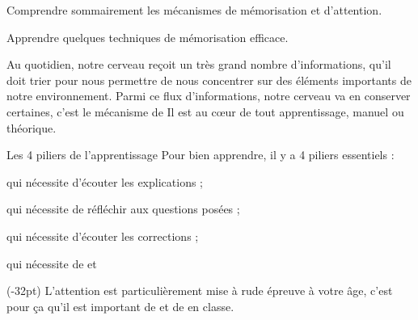 \teteSndAP
\vspace*{-32pt}

\begin{objectifs}
  \item Comprendre sommairement les mécanismes de mémorisation et d'attention.
  \item Apprendre quelques techniques de mémorisation efficace.
\end{objectifs}

\begin{contexte}
  Au quotidien, notre cerveau reçoit un très grand nombre d'informations, qu'il doit trier pour nous permettre de nous concentrer sur des éléments importants de notre environnement.
  Parmi ce flux d'informations, notre cerveau va en conserver certaines, c'est le mécanisme de  Il est au cœur de tout apprentissage, manuel ou théorique.

\end{contexte}

\begin{doc}{Les 4 piliers de l'apprentissage}
  Pour bien apprendre, il y a 4 piliers essentiels : 
  \begin{listePoints}
    \item {} qui nécessite d'écouter les explications ;
    \item {} qui nécessite de réfléchir aux questions posées ;
    \item {} qui nécessite d'écouter les corrections ;
    \item {} qui nécessite de  et 
  \end{listePoints}

  (-32pt)
  L'attention est particulièrement mise à rude épreuve à votre âge, c'est pour ça qu'il est important de  et de  en classe.
\end{doc}

